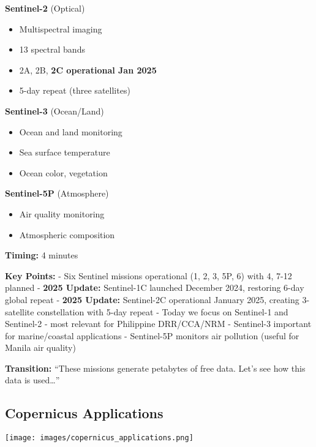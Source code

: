 \documentclass[
  letterpaper,
  DIV=11,
  numbers=noendperiod]{scrartcl}
\providecommand{\tightlist}{%
  \setlength{\itemsep}{0pt}\setlength{\parskip}{0pt}}
\begin{document}
\textbf{Sentinel-2} (Optical)

\begin{itemize}
\tightlist
\item
  Multispectral imaging
\item
  13 spectral bands
\item
  2A, 2B, \textbf{2C operational Jan 2025}
\item
  5-day repeat (three satellites)
\end{itemize}

\textbf{Sentinel-3} (Ocean/Land)

\begin{itemize}
\tightlist
\item
  Ocean and land monitoring
\item
  Sea surface temperature
\item
  Ocean color, vegetation
\end{itemize}

\textbf{Sentinel-5P} (Atmosphere)

\begin{itemize}
\tightlist
\item
  Air quality monitoring
\item
  Atmospheric composition
\end{itemize}

\textbf{Timing:} 4 minutes

\textbf{Key Points:} - Six Sentinel missions operational (1, 2, 3, 5P,
6) with 4, 7-12 planned - \textbf{2025 Update:} Sentinel-1C launched
December 2024, restoring 6-day global repeat - \textbf{2025 Update:}
Sentinel-2C operational January 2025, creating 3-satellite constellation
with 5-day repeat - Today we focus on Sentinel-1 and Sentinel-2 - most
relevant for Philippine DRR/CCA/NRM - Sentinel-3 important for
marine/coastal applications - Sentinel-5P monitors air pollution (useful
for Manila air quality)

\textbf{Transition:} ``These missions generate petabytes of free data.
Let's see how this data is used\ldots{}''

\subsection{Copernicus Applications}\label{copernicus-applications}

\begin{center}
\texttt{[image: images/copernicus\_applications.png]}
\end{center}
\end{document}
